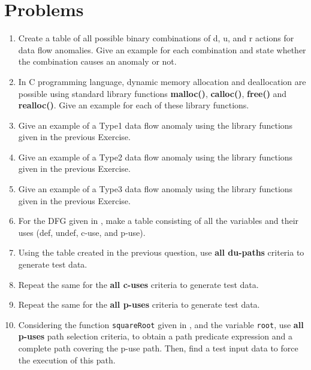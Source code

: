 \section{Problems}
\begin{enumerate}
    \item Create a table of all possible binary combinations of d, u, and r actions for data flow anomalies. Give an example for each combination and state whether the combination causes an anomaly or not.
    \item  In C programming language, dynamic memory allocation and deallocation are possible using standard library functions \textbf{malloc()}, \textbf{calloc()}, \textbf{free()} and \textbf{realloc()}. Give an example for each of these library functions.
    \item Give an example of a Type1 data flow anomaly using the library functions given in the previous Exercise.
    \item Give an example of a Type2 data flow anomaly using the library functions given in the previous Exercise.
    \item Give an example of a Type3 data flow anomaly using the library functions given in the previous Exercise.
    \item For the DFG given in , make a table consisting of all the variables and their uses (def, undef, c-use, and p-use).
     \item Using the table created in the previous question, use \textbf{all du-paths} criteria to  generate test data.
    \item Repeat the same for the \textbf{all c-uses} criteria to  generate test data.
    \item Repeat the same for the \textbf{all p-uses} criteria to  generate test data.
    \item Considering the function \lstinline!squareRoot! given in , and the variable \lstinline!root!, use \textbf{all p-uses} path selection criteria, to obtain a path predicate expression and a complete path covering the p-use path. Then, find a test input data to force the execution of this path.
\end{enumerate}